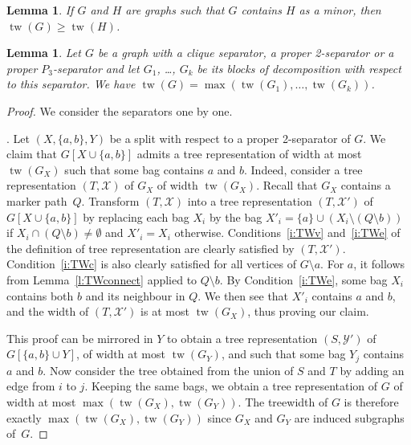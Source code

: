 \documentclass[11pt]{article}
\newtheorem{lemma}[theo]{Lemma}
\newcommand{\sm}{\setminus}
\DeclareMathOperator{\tw}{tw}
\begin{document}
\begin{lemma}
  \label{l:minorTW}
    If $G$ and $H$ are graphs such that $G$ contains $H$ as a minor, then $\tw(G) \geq \tw(H)$. 
\end{lemma}



\begin{lemma}
  \label{l:decTW}
  Let $G$ be a graph with a clique separator, a proper 2-separator or a proper $P_3$-separator and let $G_1$, \dots, $G_k$ be its blocks of decomposition with respect to this separator.  We have $\tw(G) = \max (\tw(G_1), \dots, \tw(G_k))$.    
\end{lemma}

\begin{proof}
  We consider the separators one by one. 
  
  \medskip
  
  .
  Let $(X, \{a, b\}, Y)$ be a split with respect to a proper 2-separator of $G$. 
  We claim that $G[X\cup \{a, b\}]$ admits a tree representation of width at most $\tw(G_X)$ such that some bag contains $a$ and $b$. 
  Indeed, consider a tree representation $(T, \mathcal X)$ of $G_X$ of width $\tw(G_X)$.  
  Recall that $G_X$ contains a marker path~$Q$. 
  Transform $(T, \mathcal X)$ into a tree representation $(T, \mathcal X')$ of $G[X\cup \{a, b\}]$ by replacing each bag $X_i$ by the bag $X'_i =  \{a\} \cup (X_i \sm (Q\sm b))$ if $X_i\cap (Q\sm b) \neq \emptyset$ and  $X'_i = X_i$ otherwise.
  Conditions~\ref{i:TWv} and~\ref{i:TWe} of the definition of tree representation are clearly satisfied by $(T, \mathcal X')$.  
  Condition~\ref{i:TWc} is also clearly satisfied for all vertices of $G\sm a$.  
  For $a$, it follows from Lemma~\ref{l:TWconnect} applied to $Q\sm b$. 
  By Condition~\ref{i:TWe}, some bag $X_i$ contains both $b$ and its neighbour in $Q$.  
  We then see that $X'_i$ contains $a$ and $b$, and the width of $(T, \mathcal X')$ is at most $\tw(G_X)$, thus proving our claim. 
  
  This proof can be mirrored in $Y$ to obtain a tree representation $(S, \mathcal Y')$ of $G[\{a, b\} \cup Y]$, of width at most $\tw(G_Y)$, and such that some bag $Y_j$ contains $a$ and $b$.  
  Now consider the tree obtained from the union of $S$ and $T$ by adding an edge from $i$ to $j$.  Keeping the same bags, we obtain a tree representation of $G$ of width at most $\max (\tw(G_X), \tw(G_Y))$.  
  The treewidth of $G$ is therefore exactly $\max (\tw(G_X), \tw(G_Y))$ since $G_X$ and $G_Y$ are induced subgraphs of~$G$.
  

\end{proof}
\end{document}
